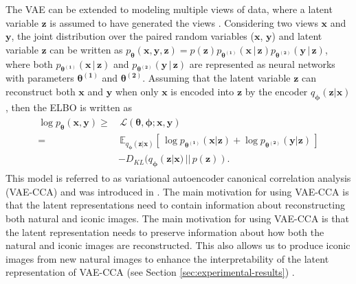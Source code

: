 The VAE can be extended to modeling multiple views of data, where a latent variable $\mathbf{z}$ is assumed to have generated the views . Considering two views $\mathbf{x}$ and $\mathbf{y}$, the joint distribution over the paired random variables ($\mathbf{x}$, $\mathbf{y}$) and latent variable $\mathbf{z}$ can be written as $p_{\boldsymbol{\theta}}(\mathbf{x}, \mathbf{y}, \mathbf{z}) = p(\mathbf{z})p_{\boldsymbol{\theta^{(1)}}}(\mathbf{x}\,|\,\mathbf{z})p_{\boldsymbol{\theta^{(2)}}}(\mathbf{y}\,|\,\mathbf{z})$, where both $p_{\boldsymbol{\theta^{(1)}}}(\mathbf{x}\,|\,\mathbf{z})$ and $p_{\boldsymbol{\theta^{(2)}}}(\mathbf{y}\,|\,\mathbf{z})$ are represented as neural networks with parameters $\boldsymbol{\theta^{(1)}}$ and $\boldsymbol{\theta^{(2)}}$. Assuming that the latent variable $\mathbf{z}$ can reconstruct both $\mathbf{x}$ and $\mathbf{y}$ when only $\mathbf{x}$ is encoded into $\mathbf{z}$ by the encoder $q_{\boldsymbol{\phi}}(\mathbf{z}|\mathbf{x})$, then the ELBO is written as 
\begin{align}
\begin{split}\label{eq:vcca-loss}
\log p_{\boldsymbol{\theta}}(\mathbf{x}, \mathbf{y}) \geq & \, \mathcal{L}(\boldsymbol{\theta}, \boldsymbol{\phi}; \mathbf{x}, \mathbf{y}) \\ 
= & \,  \mathbb{E}_{q_{\boldsymbol{\phi}}(\mathbf{z}|\mathbf{x})}\left[\, \log p_{\boldsymbol{\theta^{(1)}}}(\mathbf{x} | \mathbf{z}) + \log p_{\boldsymbol{\theta^{(2)}}}(\mathbf{y} | \mathbf{z}) \,\right] \\ 
& -D_{KL}(q_{\boldsymbol{\phi}}(\mathbf{z}|\mathbf{x})\,||\,p(\mathbf{z})) .
\end{split}
\end{align}  
This model is referred to as variational autoencoder canonical correlation analysis (VAE-CCA) and was introduced in . The main motivation for using VAE-CCA is that the latent representations need to contain information about reconstructing both natural and iconic images.
The main motivation for using VAE-CCA is that 
the latent representation needs to preserve information about how both the natural and iconic images are reconstructed. This also allows us to produce iconic images from new natural images to enhance the interpretability of the latent representation of VAE-CCA (see Section \ref{sec:experimental-results}) .

